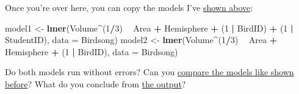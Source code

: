 \documentclass[
]{book}
\newenvironment{Shaded}{\begin{snugshade}}{\end{snugshade}}
\newcommand{\DataTypeTok}[1]{\textcolor[rgb]{0.13,0.29,0.53}{#1}}
\newcommand{\DecValTok}[1]{\textcolor[rgb]{0.00,0.00,0.81}{#1}}
\newcommand{\KeywordTok}[1]{\textcolor[rgb]{0.13,0.29,0.53}{\textbf{#1}}}
\newcommand{\NormalTok}[1]{#1}
\newcommand{\OperatorTok}[1]{\textcolor[rgb]{0.81,0.36,0.00}{\textbf{#1}}}
\newcommand{\StringTok}[1]{\textcolor[rgb]{0.31,0.60,0.02}{#1}}
\begin{document}
Once you're over here, you can copy the models I've \protect\hyperlink{brainmodel}{shown above}:

\begin{Shaded}
\begin{Highlighting}[]
\NormalTok{model1 <-}\StringTok{ }\KeywordTok{lmer}\NormalTok{(Volume}\OperatorTok{^}\NormalTok{(}\DecValTok{1}\OperatorTok{/}\DecValTok{3}\NormalTok{) }\OperatorTok{~}\StringTok{ }\NormalTok{Area }\OperatorTok{+}\StringTok{ }\NormalTok{Hemisphere }\OperatorTok{+}\StringTok{ }\NormalTok{(}\DecValTok{1} \OperatorTok{|}\StringTok{ }\NormalTok{BirdID) }\OperatorTok{+}\StringTok{ }\NormalTok{(}\DecValTok{1} \OperatorTok{|}\StringTok{ }\NormalTok{StudentID), }
               \DataTypeTok{data =}\NormalTok{ Birdsong)}
\NormalTok{model2 <-}\StringTok{ }\KeywordTok{lmer}\NormalTok{(Volume}\OperatorTok{^}\NormalTok{(}\DecValTok{1}\OperatorTok{/}\DecValTok{3}\NormalTok{) }\OperatorTok{~}\StringTok{ }\NormalTok{Area }\OperatorTok{+}\StringTok{ }\NormalTok{Hemisphere }\OperatorTok{+}\StringTok{ }\NormalTok{(}\DecValTok{1} \OperatorTok{|}\StringTok{ }\NormalTok{BirdID), }
               \DataTypeTok{data =}\NormalTok{ Birdsong)}
\end{Highlighting}
\end{Shaded}

Do both models run without errors? Can you \protect\hyperlink{comparebrain}{compare the models like shown before}? What do you conclude from \protect\hyperlink{brainoutput}{the output}?
\end{document}
